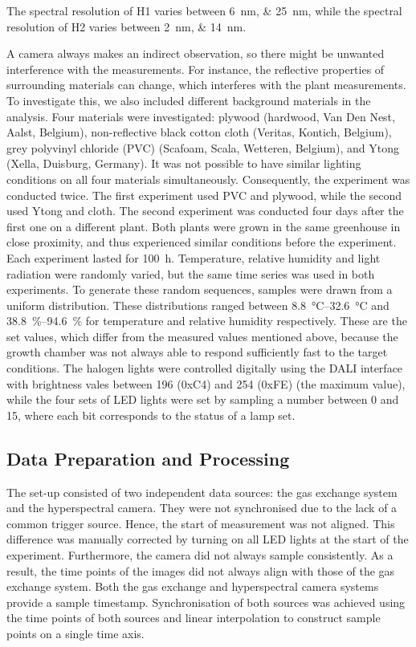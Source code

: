 \documentclass[10pt,authoryear,a4paper]{elsarticle}
\begin{document}
        The spectral resolution of H1 varies between \SIlist{6;25}{\nano\metre}, while the spectral resolution of H2 varies between \SIlist{2;14}{\nano\metre}.
        
        A camera always makes an indirect observation, so there might be unwanted interference with the measurements. For instance, the reflective properties of surrounding materials can change, which interferes with the plant measurements. To investigate this, we also included different background materials in the analysis. Four materials were investigated: plywood (hardwood, Van Den Nest, Aalst, Belgium), non-reflective black cotton cloth (Veritas, Kontich, Belgium), grey polyvinyl chloride (PVC) (Scafoam, Scala, Wetteren, Belgium), and Ytong (Xella, Duisburg, Germany). It was not possible to have similar lighting conditions on all four materials simultaneously. Consequently, the experiment was conducted twice. The first experiment used PVC and plywood, while the second used Ytong and cloth. The second experiment was conducted four days after the first one on a different plant. Both plants were grown in the same greenhouse in close proximity, and thus experienced similar conditions before the experiment. Each experiment lasted for \SI{100}{\hour}. Temperature, relative humidity and light radiation were randomly varied, but the same time series was used in both experiments. To generate these random sequences, samples were drawn from a uniform distribution. These distributions ranged between 
        \SIrange{8.8}{32.6}{\celsius} and \SIrange{38.8}{94.6}{\percent} for temperature and relative humidity respectively. These are the set values, which differ from the measured values mentioned above, because the growth chamber was not always able to respond sufficiently fast to the target conditions. The halogen lights were controlled digitally using the DALI interface with brightness vales between 196 (0xC4) and 254 (0xFE) (the maximum value), while the four sets of LED lights were set by sampling a number between 0 and 15, where each bit corresponds to the status of a lamp set. 
        
    \subsection{Data Preparation and Processing}  
        
        The set-up consisted of two independent data sources: the gas exchange system and the hyperspectral camera. They were not synchronised due to the lack of a common trigger source. Hence, the start of measurement was not aligned. This difference was manually corrected by turning on all LED lights at the start of the experiment. Furthermore, the camera did not always sample consistently. As a result, the time points of the images did not always align with those of the gas exchange system. Both the gas exchange and hyperspectral camera systems provide a sample timestamp.  Synchronisation of both sources was achieved using the time points of both sources and linear interpolation to construct sample points on a single time axis.
        
\end{document}
